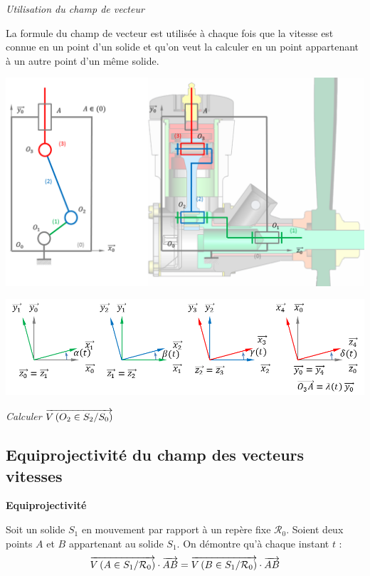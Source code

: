\documentclass[11pt,oneside]{article}
\begin{document}
\begin{rem}
\textit{Utilisation du champ de vecteur}

La formule du champ de vecteur est utilisée à chaque fois que la vitesse est connue en un point d'un solide et qu'on veut la calculer en un point appartenant à un autre point d'un même solide. 
\end{rem}

\begin{exemple}
\begin{center}
\includegraphics[width=.8\textwidth]{png/moteur_2d_sch}

\includegraphics[width=\textwidth]{png/param}
\end{center}
\textit{Calculer $\overrightarrow{V\left( {O_2} \in {S_2}/{S_0}\right)}$}

\vspace{5cm}

\end{exemple}
\subsection{Equiprojectivité du champ des vecteurs vitesses}
\begin{resultat}
\textbf{Equiprojectivité}

Soit un solide $S_1$ en mouvement par rapport à un repère fixe $\mathcal{R}_0$. Soient deux points $A$ et $B$ appartenant au solide $S_1$. On démontre qu'à chaque instant $t$ :
$$
\overrightarrow{V\left( {A} \in {S_1}/{\mathcal{R}_0}\right)}\cdot \overrightarrow{AB} = 
\overrightarrow{V\left( {B} \in {S_1}/{\mathcal{R}_0}\right)}\cdot \overrightarrow{AB}
$$
\end{resultat}
\end{document}
